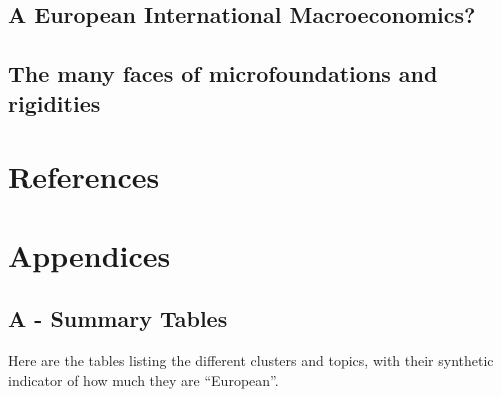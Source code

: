 \documentclass[]{elsarticle} %
\newlength{\cslhangindent}
\newlength{\cslentryspacingunit} %
\newenvironment{CSLReferences}[2] %
 {%
  \setlength{\parindent}{0pt}
  \ifodd #1
  \let\oldpar\par
  \def\par{\hangindent=\cslhangindent\oldpar}
  \fi
  \setlength{\parskip}{#2\cslentryspacingunit}
 }%
 {}
\begin{document}
\hypertarget{international-macro}{%
\subsection{A European International
Macroeconomics?}\label{international-macro}}

\hypertarget{rigidities}{%
\subsection{The many faces of microfoundations and
rigidities}\label{rigidities}}

\newpage

\hypertarget{references}{%
\section*{References}\label{references}}

\hypertarget{refs}{}
\begin{CSLReferences}{0}{0}
\end{CSLReferences}

\newpage

\hypertarget{appendices}{%
\section*{Appendices}\label{appendices}}

\hypertarget{a---summary-tables}{%
\subsection*{A - Summary Tables}\label{a---summary-tables}}

Here are the tables listing the different clusters and topics, with
their synthetic indicator of how much they are ``European''.
\end{document}
